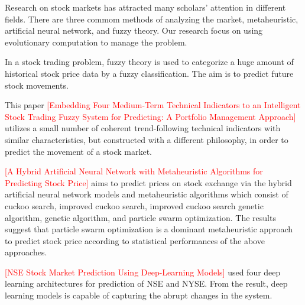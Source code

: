 \documentclass[../main.tex]{subfiles}
\begin{document}
Research on stock markets has attracted many scholars' attention in different fields. There are three commom methods of analyzing the market, metaheuristic, artificial neural network, and fuzzy theory. Our research focus on using evolutionary computation to manage the problem.
\bigbreak

In a stock trading problem, fuzzy theory is used to categorize a huge amount of historical stock price data by a fuzzy classification. The aim is to predict future stock movements.
\bigbreak

This paper \textcolor{red}{[Embedding Four Medium-Term Technical Indicators to an Intelligent Stock Trading Fuzzy System for Predicting: A Portfolio Management Approach]} utilizes a small number of coherent trend-following technical indicators with similar characteristics, but constructed with a different philosophy, in order to predict the movement of a stock market.
\bigbreak

\textcolor{red}{[A Hybrid Artificial Neural Network with Metaheuristic Algorithms for Predicting Stock Price]} aims to predict prices on stock exchange via the hybrid artificial neural network models and metaheuristic algorithms which consist of cuckoo search, improved cuckoo search, improved cuckoo search genetic algorithm, genetic algorithm, and particle swarm optimization. The results suggest that particle swarm optimization is a dominant metaheuristic approach to predict stock price according to statistical performances of the above approaches.
\bigbreak

\textcolor{red}{[NSE Stock Market Prediction Using Deep-Learning Models]} used four deep learning architectures for prediction of NSE and NYSE. From the result, deep learning models is capable of capturing the abrupt changes in the system.
\bigbreak
\end{document}
